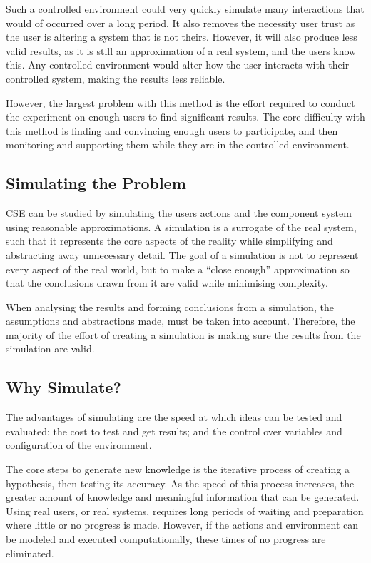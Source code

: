 Such a controlled environment could very quickly simulate  many interactions that would of occurred over a long period.  
It also removes the necessity user trust as the user is altering a system that is not theirs.
However, it will also produce less valid results, as it is still an approximation of a real system, and the users know this.
Any controlled environment would alter how the user interacts with their controlled system, making the results less reliable.

However, the largest problem with this method is the effort required to conduct the experiment on enough users to find significant results.
The core difficulty with this method is finding and convincing enough users to participate, and then monitoring and supporting them while they are in the controlled environment.

\subsection{Simulating the Problem}
CSE can be studied by simulating the users actions and the component system using reasonable approximations.
A simulation is a surrogate of the real system, 
such that it represents the core aspects of the reality while simplifying and abstracting away unnecessary detail.
The goal of a simulation is not to represent every aspect of the real world, 
but to make a ``close enough'' approximation so that the conclusions drawn from it are valid while minimising complexity.

When analysing the results and forming conclusions from a simulation, 
the assumptions and abstractions made, must be taken into account.
Therefore, the majority of the effort of creating a simulation is making sure the results from the simulation are valid.

\subsection{Why Simulate?}
The advantages of simulating are the speed at which ideas can be tested and evaluated;
the cost to test and get results; and the control over variables and configuration of the environment.

The core steps to generate new knowledge is the iterative process of creating a hypothesis, then testing its accuracy.
As the speed of this process increases, the greater amount of knowledge and meaningful information that can be generated. 
Using real users, or real systems, requires long periods of waiting and preparation where little or no progress is made.
However, if the actions and environment can be modeled and executed computationally, these times of no progress are eliminated.

